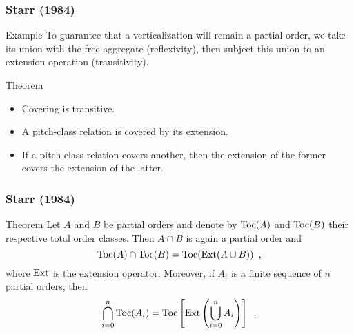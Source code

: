 \begin{frame}
	\frametitle{Starr (1984)}
	\begin{block}{Example}
		To guarantee that a verticalization will remain a partial order, we take its union with the free aggregate (reflexivity), then subject this union to an extension operation (transitivity).
	\end{block}
	\begin{block}{Theorem}
		\begin{itemize}
        	\item Covering is transitive.
        	\item A pitch-class relation is covered by its extension.
        	\item If a pitch-class relation covers another, then the extension of the former covers the extension of the latter.
    	\end{itemize}
	\end{block}
\end{frame}

\begin{frame}
	\frametitle{Starr (1984)}
	\begin{block}{Theorem}
		Let $A$ and $B$ be partial orders and denote by $\operatorname{Toc}(A)$ and $\operatorname{Toc}(B)$ their respective total order classes. Then $A \cap B$ is again a partial order and
    	\begin{equation*}
        	\operatorname{Toc}(A) \cap \operatorname{Toc}(B) = \operatorname{Toc}(\operatorname{Ext}(A \cup B)) \enspace,
    	\end{equation*}
    	where $\operatorname{Ext}$ is the extension operator. Moreover, if $A_i$ is a finite sequence of $n$ partial orders, then
    	\begin{equation*}
        	\bigcap_{i = 0}^{n} \operatorname{Toc}(A_i) = \operatorname{Toc} \left[ \operatorname{Ext}\left ( \bigcup_{i = 0}^{n} A_i \right) \right] \enspace.
    	\end{equation*}
	\end{block}
\end{frame}

